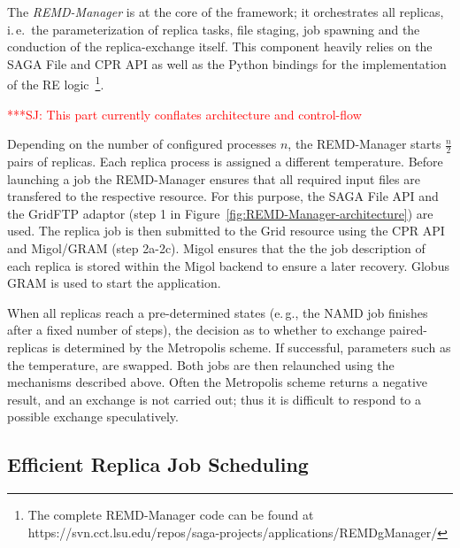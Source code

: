 \documentclass{rspublic}
\newcommand{\alnote}[1]{ {\textcolor{blue} { ***AL: #1 }}}
\newcommand{\jhanote}[1]{ {\textcolor{red} { ***SJ: #1 }}}
\newcommand{\alnote}[1]{}
\newcommand{\jhanote}[1]{}
\begin{document}
The \emph{REMD-Manager} is at the core of the framework; it
orchestrates all replicas, i.\,e.\ the parameterization of replica
tasks, file staging, job spawning and the conduction of the
replica-exchange itself. This component heavily relies on the SAGA
File and CPR API as well as the Python bindings for the implementation
of the RE logic~\footnote{The complete REMD-Manager code can be found
at https://svn.cct.lsu.edu/repos/saga-projects/applications/REMDgManager/}.
                                  

\jhanote{This part currently conflates architecture and control-flow}

Depending on the number of configured processes $n$, the REMD-Manager
starts $\frac{n}{2}$ pairs of replicas.  Each replica process is
assigned a different temperature. Before launching a job the
REMD-Manager ensures that all required input files are transfered to
the respective resource. For this purpose, the SAGA File API and the
GridFTP adaptor (step 1 in Figure~\ref{fig:REMD-Manager-architecture})
are used.  The replica job is then submitted to the Grid resource
using the CPR API and Migol/GRAM (step 2a-2c). Migol ensures that the
the job description of each replica is stored within the Migol backend
to ensure a later recovery. Globus GRAM is used to start the
application.

When all replicas reach a pre-determined states (e.\,g., the NAMD job finishes 
after a fixed number of steps), the decision as to whether to exchange
paired-replicas is determined by the Metropolis scheme. If successful,
parameters such as the temperature, are swapped. Both jobs are then
relaunched using the mechanisms described above. Often the Metropolis
scheme returns a negative result, and an exchange is not carried out;
thus it is difficult to respond to a possible exchange speculatively. 

           
\subsection{Efficient Replica Job Scheduling}
\end{document}
